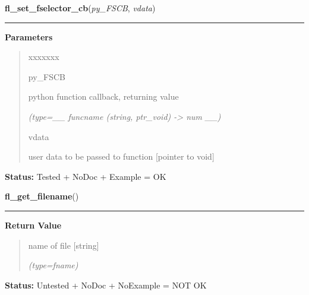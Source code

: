 \hspace{.8\funcindent}\begin{boxedminipage}{\funcwidth}

    \raggedright \textbf{fl\_set\_fselector\_cb}(\textit{py\_FSCB}, \textit{vdata})

    \vspace{-1.5ex}

    \rule{\textwidth}{0.5\fboxrule}
\setlength{\parskip}{2ex}
\setlength{\parskip}{1ex}
      \textbf{Parameters}
      \vspace{-1ex}

      \begin{quote}
        \begin{Ventry}{xxxxxxx}

          \item[py\_FSCB]

          python function callback, returning value

            {\it (type=\_\_ funcname (string, ptr\_void) -{\textgreater} num \_\_)}

          \item[vdata]

          user data to be passed to function [pointer to void]

        \end{Ventry}

      \end{quote}

\textbf{Status:} Tested + NoDoc + Example = OK



    \end{boxedminipage}

    \label{xformslib:library:fl_get_filename}

    \vspace{0.5ex}

\hspace{.8\funcindent}\begin{boxedminipage}{\funcwidth}

    \raggedright \textbf{fl\_get\_filename}()

    \vspace{-1.5ex}

    \rule{\textwidth}{0.5\fboxrule}
\setlength{\parskip}{2ex}
\setlength{\parskip}{1ex}
      \textbf{Return Value}
    \vspace{-1ex}

      \begin{quote}
      name of file [string]

      {\it (type=fname)}

      \end{quote}

\textbf{Status:} Untested + NoDoc + NoExample = NOT OK



    \end{boxedminipage}

